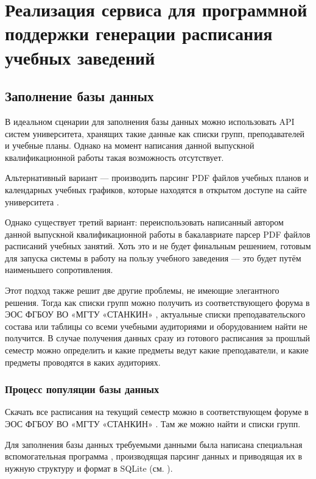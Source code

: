 \section{Реализация сервиса для программной поддержки генерации расписания учебных заведений}

\subsection{Заполнение базы данных}

В идеальном сценарии для заполнения базы данных можно использовать API систем университета, хранящих такие данные как списки групп, преподавателей и учебные планы. Однако на момент написания данной выпускной квалификационной работы такая возможность отсутствует.

Альтернативный вариант --- производить парсинг PDF файлов учебных планов и календарных учебных графиков, которые находятся в открытом доступе на сайте университета \cite{stankin:edu_programs,stankin:calendar}.

Однако существует третий вариант: переиспользовать написанный автором данной выпускной квалификационной работы в бакалавриате парсер \cite{github:grad_work_alpha} PDF файлов расписаний учебных занятий. Хоть это и не будет финальным решением, готовым для запуска системы в работу на пользу учебного заведения --- это будет путём наименьшего сопротивления.

Этот подход также решит две другие проблемы, не имеющие элегантного решения. Тогда как списки групп можно получить из соответствующего форума в ЭОС ФГБОУ ВО «МГТУ «СТАНКИН» \cite{stankin:groups}, актуальные списки преподавательского состава или таблицы со всеми учебными аудиториями и оборудованием найти не получится. В случае получения данных сразу из готового расписания за прошлый семестр можно определить и какие предметы ведут какие преподаватели, и какие предметы проводятся в каких аудиториях.

\subsubsection{Процесс популяции базы данных}

Скачать все расписания на текущий семестр можно в соответствующем форуме в ЭОС ФГБОУ ВО «МГТУ «СТАНКИН» \cite{stankin:schedule}. Там же можно найти и списки групп.

Для заполнения базы данных требуемыми данными была написана специальная вспомогательная программа \cite{github:subject_parser}, производящая парсинг данных и приводящая их в нужную структуру и формат в SQLite (см. ).

